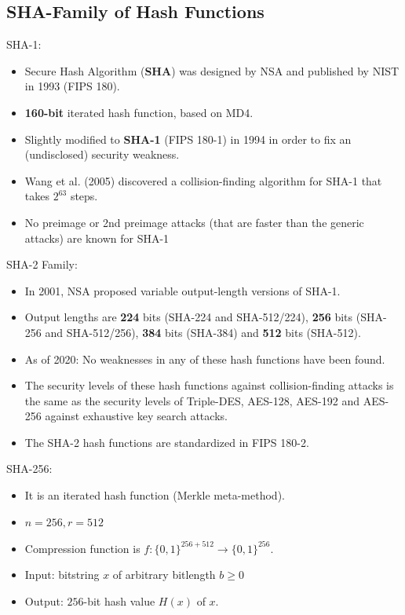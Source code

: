 \documentclass[12pt,titlepage]{article}
\begin{document}
\subsection{SHA-Family of Hash Functions}
SHA-1: \begin{itemize}
\item Secure Hash Algorithm (\textbf{SHA}) was designed by NSA and published by NIST in 1993 (FIPS 180).
\item \textbf{160-bit} iterated hash function, based on MD4.
\item Slightly modified to \textbf{SHA-1} (FIPS 180-1) in 1994 in order to fix an (undisclosed) security weakness.
\item Wang et al. (2005) discovered a collision-finding algorithm for SHA-1 that takes $2^{63}$ steps.
\item No preimage or 2nd preimage attacks (that are faster than the generic attacks) are known for SHA-1
\end{itemize}

SHA-2 Family: \begin{itemize}
\item In 2001, NSA proposed variable output-length versions of SHA-1.
\item Output lengths are \textbf{224} bits (SHA-224 and SHA-512/224), \textbf{256} bits (SHA-256 and SHA-512/256), \textbf{384} bits (SHA-384) and \textbf{512} bits (SHA-512).
\item As of 2020: No weaknesses in any of these hash functions have been found.
\item The security levels of these hash functions against collision-finding attacks is the same as the security levels of Triple-DES, AES-128, AES-192 and AES-256 against exhaustive key search attacks.
\item The SHA-2 hash functions are standardized in FIPS 180-2.
\end{itemize}

SHA-256: \begin{itemize}
\item It is an iterated hash function (Merkle meta-method).
\item $n = 256, r = 512$
\item Compression function is $f : \{0, 1\}^{256+512} \rightarrow \{0, 1\}^{256}$.
\item Input: bitstring $x$ of arbitrary bitlength $b \geq 0$
\item Output: $256$-bit hash value $H(x)$ of $x$.
\end{itemize}
\end{document}
